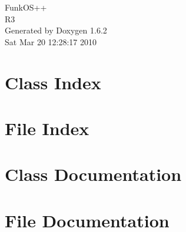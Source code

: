 \documentclass[a4paper]{book}
\begin{document}
\begin{titlepage}
\vspace*{7cm}
\begin{center}
{\Large FunkOS++ \\[1ex]\large R3 }\\
\vspace*{1cm}
{\large Generated by Doxygen 1.6.2}\\
\vspace*{0.5cm}
{\small Sat Mar 20 12:28:17 2010}\\
\end{center}
\end{titlepage}
\clearemptydoublepage
{}
\tableofcontents
\clearemptydoublepage
{}
\chapter{Class Index}

\chapter{File Index}

\chapter{Class Documentation}








\chapter{File Documentation}


















\printindex
\end{document}
